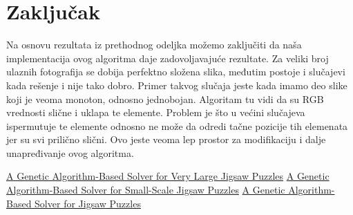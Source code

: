 \documentclass{article}
\begin{document}
\section{Zaključak}
Na osnovu rezultata iz prethodnog odeljka možemo zaključiti da naša implementacija ovog algoritma daje zadovoljavajuće rezultate. Za veliki broj ulaznih fotografija se dobija perfektno složena slika, međutim postoje i slučajevi kada rešenje i nije tako dobro. Primer takvog slučaja jeste kada imamo deo slike koji je veoma monoton, odnosno jednobojan. Algoritam tu vidi da su RGB vrednosti slične i uklapa te elemente. Problem je što u većini slučajeva ispermutuje te elemente odnosno ne može da odredi tačne pozicije tih elemenata jer su svi prilično slični. Ovo jeste veoma lep prostor za modifikaciju i dalje unapređivanje ovog algoritma. 
\newpage

\begin{thebibliography}{9}

\href{https://openaccess.thecvf.com/content_cvpr_2013/papers/Sholomon_A_Genetic_Algorithm-Based_2013_CVPR_paper.pdf}{A Genetic Algorithm-Based Solver for Very Large Jigsaw Puzzles}
\href{https://link.springer.com/chapter/10.1007/978-3-030-53956-6_32}{A Genetic Algorithm-Based Solver for Small-Scale Jigsaw Puzzles}
\href{https://web.stanford.edu/class/cs231a/prev_projects_2015/JordanDavidson.pdf}{A Genetic Algorithm-Based Solver for Jigsaw Puzzles}
\end{thebibliography}
\end{document}
